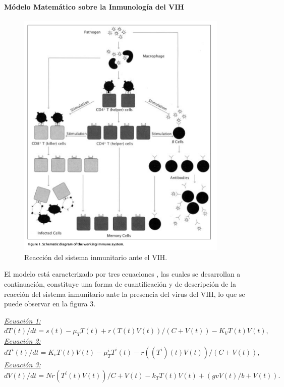 \documentclass[a4paper,twocolumn,10pt]{article}
\begin{document}
\paragraph{Módelo Matemático sobre la Inmunología del VIH} 
\begin{figure}[htb]
\centering
\includegraphics[width=0.9\textwidth]{./sistemainmuneVIH}
\caption{Reacción del sistema inmunitario ante el VIH. \cite{Kirschner1996}}
\label{fig:sistemainmuneVIH}
\end{figure}
El modelo está caracterizado por tres ecuaciones \cite{Kirschner1996}, las cuales se desarrollan a continuación, constituye una forma de cuantificación y de descripción de la reacción del sistema inmunitario ante la presencia del virus del VIH, lo que se puede observar en la figura 3. 
\begin{center}
\doublespacing
{\itshape \underline{Ecuación 1:}} \\
$dT(t)/dt = s(t)-\mu_TT(t)+ r(T(t)V(t))/(C+V(t))-K_VT(t)V(t),$ \\ 
{\itshape \underline {Ecuación 2:}} \\
$dT^i(t)/dt = K_vT(t)V(t)-\mu_T^iT^i(t)-r((T^i)(t)V(t))/(C+V(t)),$ \\
{\itshape \underline {Ecuación 3:}} \\
$dV(t)/dt=Nr(T^i(t)V(t))/C+V(t)-k_TT(t)V(t)+(gvV(t)/b+V(t)). $ \\
\end{center}
\end{document}
